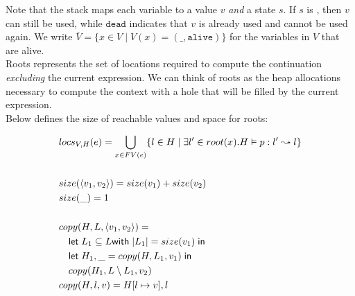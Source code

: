 \documentclass[11pt]{article}
\newcommand{\irl}[1]{\mathtt{#1}}
\begin{document}
\noindent
Note that the stack maps each variable to a value $v$ \emph{and} a state $s$. If $s$ is \irl{alive}, then $v$ can still be used, while $\irl{dead}$ indicates that $v$ is already used and cannot be used again. We write $\overline V = \{x \in V \mid V(x) = (\_,\irl{alive}) \}$ for the variables in $V$ that are alive.\\ 

\noindent
Roots represents the set of locations required to compute the continuation \emph{excluding} the current expression.
We can think of roots as the heap allocations necessary to compute the context with a hole that will be filled
by the current expression.\\


\noindent
Below defines the size of reachable values and space for roots:

\begin{align*}
  &locs_{V,H}(e) = \bigcup\limits_{x \in FV(e)} \{l \in H \mid \exists l' \in root(x). H \vDash p : l' \leadsto l\}\\\\
  &size(\langle v_1, v_2\rangle) = size(v_1) + size(v_2)\\
  &size(\_) = 1\\\\
  &copy(H,L,\langle v_1, v_2\rangle) =\\
  &\quad\mathsf{let }\; L_1 \subseteq L \mathsf{ with }\; |L_1| = size(v_1) \;\mathsf{ in}\\
  &\quad\mathsf{let }\; H_1,\_ = copy(H,L_1,v_1) \;\mathsf{ in} \\
  &\quad copy(H_1,L \setminus L_1, v_2)\\
  &copy(H,l,v) = H[l \mapsto v], l\\
\end{align*}
\end{document}
